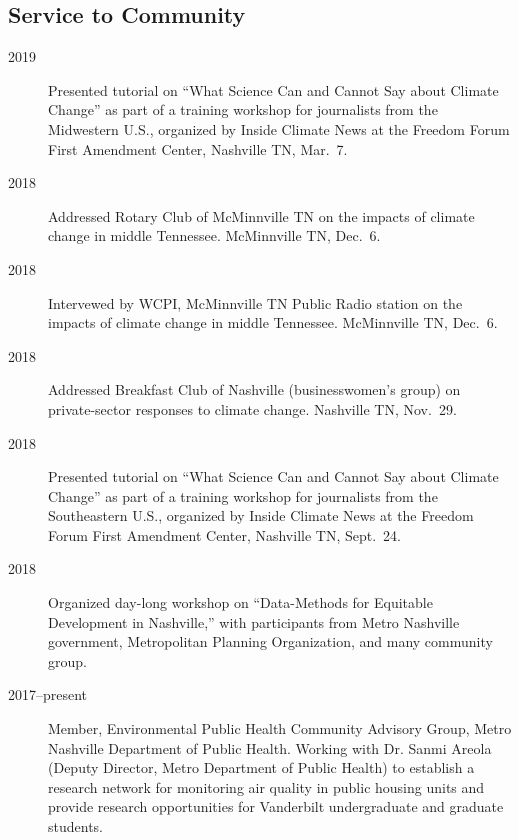 \documentclass[10pt]{article}
\begin{document}
    \subsection{Service to Community}
        \begin{description}
            \item[2019] Presented tutorial on ``What Science Can and Cannot Say about Climate Change'' as part of a training workshop for journalists from the Midwestern U.S., organized by Inside Climate News at the Freedom Forum First Amendment Center, Nashville TN, Mar.~7.
            \item[2018] Addressed Rotary Club of McMinnville TN on the impacts of climate change in middle Tennessee. McMinnville TN, Dec.\ 6.
            \item[2018] Intervewed by WCPI, McMinnville TN Public Radio station on the impacts of climate change in middle Tennessee. McMinnville TN, Dec.\ 6.
            \item[2018] Addressed Breakfast Club of Nashville (businesswomen's group) on private-sector responses to climate change. Nashville TN, Nov.\ 29. 
            \item[2018] Presented tutorial on ``What Science Can and Cannot Say about Climate Change'' as part of a training workshop for journalists from the Southeastern U.S., organized by Inside Climate News at the Freedom Forum First Amendment Center, Nashville TN, Sept.~24.
            \item[2018] Organized day-long workshop on ``Data-Methods for Equitable Development in Nashville,'' with participants from Metro Nashville government, Metropolitan Planning Organization,
            and many community group.
            \item[2017--present] Member, Environmental Public Health Community Advisory Group, Metro Nashville Department of Public Health. Working with Dr. Sanmi Areola (Deputy Director, Metro Department of Public Health)
            to establish a research network for monitoring air quality in public housing units and provide research opportunities for Vanderbilt undergraduate and graduate students.

\end{description}
\end{document}
